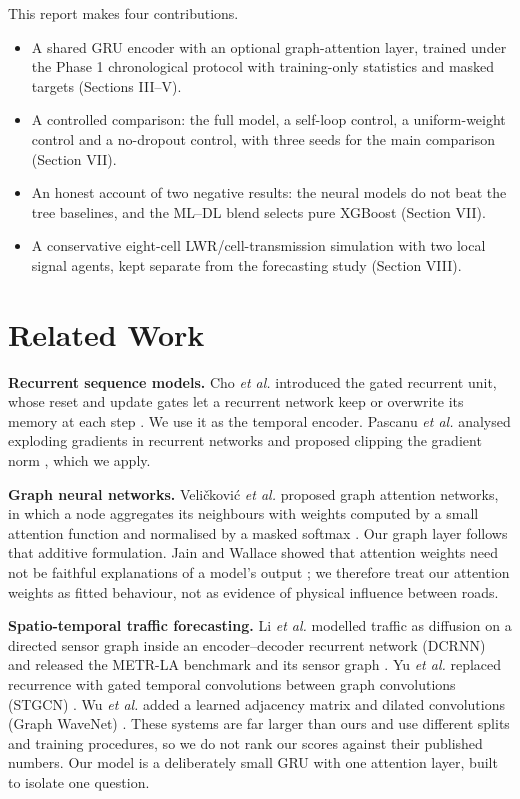 \documentclass[conference]{IEEEtran}
\begin{document}
This report makes four contributions.
\begin{itemize}
\item A shared GRU encoder with an optional graph-attention layer, trained under the Phase 1 chronological protocol with training-only statistics and masked targets (Sections III--V).
\item A controlled comparison: the full model, a self-loop control, a uniform-weight control and a no-dropout control, with three seeds for the main comparison (Section VII).
\item An honest account of two negative results: the neural models do not beat the tree baselines, and the ML--DL blend selects pure XGBoost (Section VII).
\item A conservative eight-cell LWR/cell-transmission simulation with two local signal agents, kept separate from the forecasting study (Section VIII).
\end{itemize}

\section{Related Work}
\textbf{Recurrent sequence models.} Cho \emph{et al.} introduced the gated recurrent unit, whose reset and update gates let a recurrent network keep or overwrite its memory at each step \cite{cho}. We use it as the temporal encoder. Pascanu \emph{et al.} analysed exploding gradients in recurrent networks and proposed clipping the gradient norm \cite{pascanu}, which we apply.

\textbf{Graph neural networks.} Veli\v{c}kovi\'c \emph{et al.} proposed graph attention networks, in which a node aggregates its neighbours with weights computed by a small attention function and normalised by a masked softmax \cite{gat}. Our graph layer follows that additive formulation. Jain and Wallace showed that attention weights need not be faithful explanations of a model's output \cite{attn}; we therefore treat our attention weights as fitted behaviour, not as evidence of physical influence between roads.

\textbf{Spatio-temporal traffic forecasting.} Li \emph{et al.} modelled traffic as diffusion on a directed sensor graph inside an encoder--decoder recurrent network (DCRNN) and released the METR-LA benchmark and its sensor graph \cite{dcrnn}. Yu \emph{et al.} replaced recurrence with gated temporal convolutions between graph convolutions (STGCN) \cite{stgcn}. Wu \emph{et al.} added a learned adjacency matrix and dilated convolutions (Graph WaveNet) \cite{gwn}. These systems are far larger than ours and use different splits and training procedures, so we do not rank our scores against their published numbers. Our model is a deliberately small GRU with one attention layer, built to isolate one question.
\end{document}
